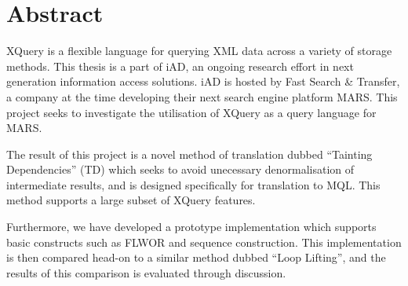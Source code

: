 \chapter*{Abstract}
XQuery is a flexible language for querying XML data across a variety of storage
methods. This thesis is a part of iAD, an ongoing research effort in
next generation information access solutions. iAD is hosted by Fast Search \&
Transfer, a company at the time developing their next search engine platform
MARS. This project seeks to investigate the utilisation of XQuery as a query
language for MARS.

The result of this project is a novel method of translation dubbed ``Tainting
Dependencies'' (TD) which seeks to avoid unecessary
denormalisation of intermediate results, and is designed specifically
for translation to MQL. This method supports a large subset of XQuery features.

Furthermore, we have developed a prototype implementation which supports basic
constructs such as FLWOR and sequence construction. This implementation is
then compared head-on to a similar method dubbed ``Loop Lifting'', and the
results of this comparison is evaluated through discussion.

% 
